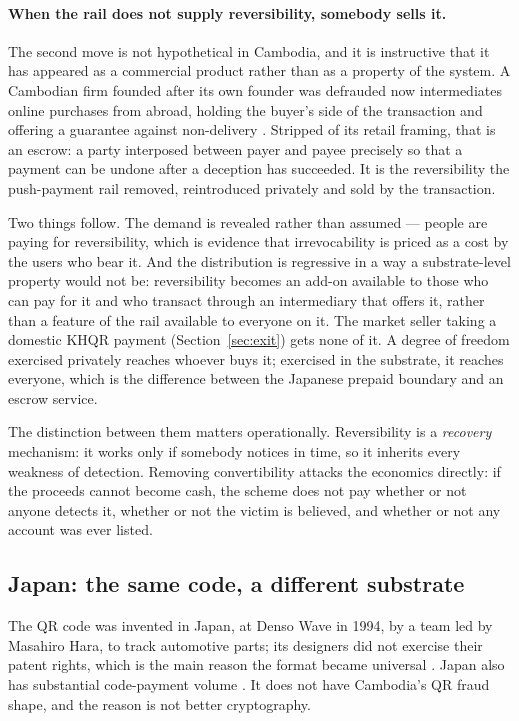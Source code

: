 \documentclass[10pt,a4paper,twocolumn]{article}
\begin{document}
\paragraph{When the rail does not supply reversibility, somebody sells it.}
The second move is not hypothetical in Cambodia, and it is instructive that it
has appeared as a commercial product rather than as a property of the system. A
Cambodian firm founded after its own founder was defrauded now intermediates
online purchases from abroad, holding the buyer's side of the transaction and
offering a guarantee against non-delivery \citep{wingbank2025espass}. Stripped
of its retail framing, that is an escrow: a party interposed between payer and
payee precisely so that a payment can be undone after a deception has succeeded.
It is the reversibility the push-payment rail removed, reintroduced privately
and sold by the transaction.

Two things follow. The demand is revealed rather than assumed --- people are
paying for reversibility, which is evidence that irrevocability is priced as a
cost by the users who bear it. And the distribution is regressive in a way a
substrate-level property would not be: reversibility becomes an add-on available
to those who can pay for it and who transact through an intermediary that offers
it, rather than a feature of the rail available to everyone on it. The market
seller taking a domestic KHQR payment
(Section~\ref{sec:exit}) gets none of it. A degree of freedom exercised
privately reaches whoever buys it; exercised in the substrate, it reaches
everyone, which is the difference between the Japanese prepaid boundary and an
escrow service.

The distinction between them matters operationally. Reversibility is a
\emph{recovery} mechanism: it works only if somebody notices in time, so it
inherits every weakness of detection. Removing convertibility attacks the
economics directly: if the proceeds cannot become cash, the scheme does not pay
whether or not anyone detects it, whether or not the victim is believed, and
whether or not any account was ever listed.

\subsection{Japan: the same code, a different substrate}
\label{sec:japan}

The QR code was invented in Japan, at Denso Wave in 1994, by a team led by
Masahiro Hara, to track automotive parts; its designers did not exercise their
patent rights, which is the main reason the format became universal
\citep{densowave}. Japan also has substantial code-payment volume
\citep{meti2026cashless}. It does not have Cambodia's QR fraud shape, and the
reason is not better cryptography.
\end{document}
